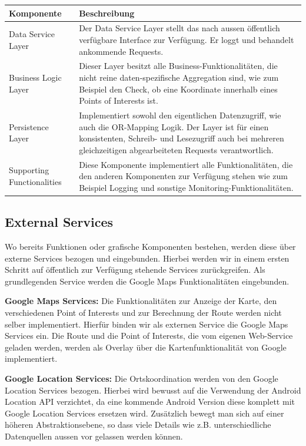 \documentclass[a4paper,10pt,xetex]{article}
\begin{document}
\begin{longtabu} to \textwidth { | l | X[l] | }
\hline
\textbf{Komponente} & \textbf{Beschreibung} \\\hline
\endhead

Data Service Layer & Der Data Service Layer stellt das nach aussen öffentlich verfügbare
Interface zur Verfügung. Er loggt und behandelt ankommende
Requests.\\\hline

Business Logic Layer & Dieser Layer besitzt alle Business-Funktionalitäten, die nicht reine
daten-spezifische Aggregation sind, wie zum Beispiel den Check, ob eine
Koordinate innerhalb eines Points of Interests ist.\\\hline

Persistence Layer & Implementiert sowohl den eigentlichen Datenzugriff, wie auch die
OR-Mapping Logik. Der Layer ist für einen konsistenten, Schreib- und
Lesezugriff auch bei mehreren gleichzeitigen abgearbeiteten Requests
verantwortlich.\\\hline

Supporting Functionalities & Diese Komponente implementiert alle Funktionalitäten, die den anderen
Komponenten zur Verfügung stehen wie zum Beispiel Logging und sonstige
Monitoring-Funktionalitäten.\\\hline
\end{longtabu}


\subsection{External Services}\label{external-services}
Wo bereits Funktionen oder grafische
Komponenten bestehen, werden diese über externe Services bezogen und
eingebunden. Hierbei werden wir in einem ersten Schritt auf öffentlich
zur Verfügung stehende Services zurückgreifen. Als grundlegenden Service
werden die Google Maps Funktionalitäten eingebunden. \newline

\textbf{Google Maps Services:} Die Funktionalitäten zur Anzeige der Karte, den
verschiedenen Point of Interests und zur Berechnung der Route werden
nicht selber implementiert. Hierfür binden wir als externen Service die
Google Maps Services ein. Die Route und die Point of Interests, die vom
eigenen Web-Service geladen werden, werden als Overlay über die
Kartenfunktionalität von Google implementiert. \newline

\textbf{Google Location Services:} Die Ortskoordination werden von den Google
Location Services bezogen. Hierbei wird bewusst auf die Verwendung der Android Location
API verzichtet, da eine kommende Android Version diese komplett mit Google Location
Services ersetzen wird. Zusätzlich bewegt man sich auf einer höheren Abstraktionsebene, so dass
viele Details wie z.B. unterschiedliche Datenquellen aussen vor gelassen werden können.
\end{document}
